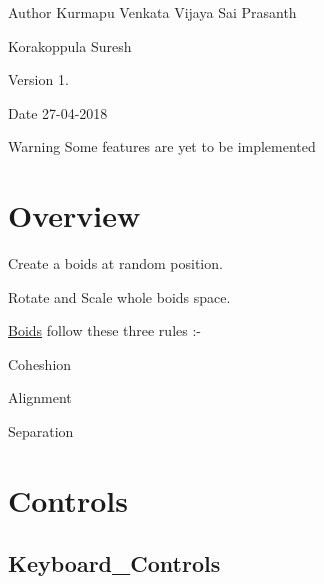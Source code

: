 \begin{DoxyAuthor}{Author}
Kurmapu Venkata Vijaya Sai Prasanth 

Korakoppula Suresh 
\end{DoxyAuthor}
\begin{DoxyVersion}{Version}
1. 
\end{DoxyVersion}
\begin{DoxyDate}{Date}
27-\/04-\/2018 
\end{DoxyDate}
\begin{DoxyWarning}{Warning}
Some features are yet to be implemented
\end{DoxyWarning}
\hypertarget{index_Functionality}{}\section{Overview}\label{index_Functionality}

\begin{DoxyEnumerate}
\item Create a boids at random position.
\item Rotate and Scale whole boids space.
\item \mbox{\hyperlink{class_boids}{Boids}} follow these three rules \+:-\/
\begin{DoxyItemize}
\item Coheshion
\item Alignment
\end{DoxyItemize}
\end{DoxyEnumerate}

Separation \hypertarget{index_Controls}{}\section{Controls}\label{index_Controls}
\hypertarget{index_Keyboard_Controls}{}\subsection{Keyboard\+\_\+\+Controls}\label{index_Keyboard_Controls}

